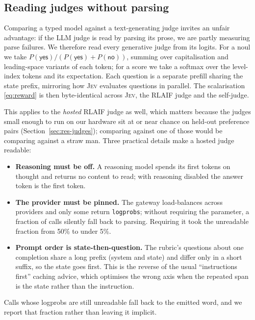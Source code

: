 \documentclass[11pt]{article}
\newcommand{\jev}{\textsc{Jev}}
\begin{document}
\subsection{Reading judges without parsing}
\label{sec:parsefree}
Comparing a typed model against a text-generating judge invites an unfair
advantage: if the LLM judge is read by parsing its prose, we are partly
measuring parse failures. We therefore read every generative judge from its
logits. For a noul we take
$P(\textsf{yes}) / (P(\textsf{yes}) + P(\textsf{no}))$, summing over
capitalisation and leading-space variants of each token; for a score we take a
softmax over the level-index tokens and its expectation. Each question is a
separate prefill sharing the state prefix, mirroring how \jev{} evaluates
questions in parallel. The scalarisation \eqref{eq:reward} is then byte-identical
across \jev{}, the RLAIF judge and the self-judge.

This applies to the \emph{hosted} RLAIF judge as well, which matters because
the judges small enough to run on our hardware sit at or near chance on held-out
preference pairs (Section~\ref{sec:res-judges}); comparing against one of those
would be comparing against a straw man. Three practical details make a hosted
judge readable:

\begin{itemize}
  \item \textbf{Reasoning must be off.} A reasoning model spends its first
    tokens on thought and returns no content to read; with reasoning disabled
    the answer token is the first token.
  \item \textbf{The provider must be pinned.} The gateway load-balances across
    providers and only some return \texttt{logprobs}; without requiring the
    parameter, a fraction of calls silently fall back to parsing. Requiring it
    took the unreadable fraction from 50\% to under 5\%.
  \item \textbf{Prompt order is state-then-question.} The rubric's questions
    about one completion share a long prefix (system and state) and differ only
    in a short suffix, so the state goes first. This is the reverse of the usual
    ``instructions first'' caching advice, which optimises the wrong axis when
    the repeated span is the state rather than the instruction.
\end{itemize}

Calls whose logprobs are still unreadable fall back to the emitted word, and we
report that fraction rather than leaving it implicit.
\end{document}
